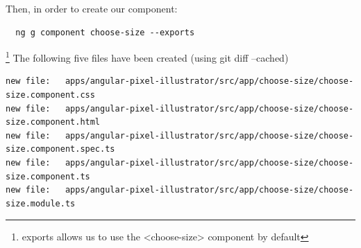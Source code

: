 Then, in order to create our component:
\begin{verbatim}
  ng g component choose-size --exports
\end{verbatim}
\footnote{exports allows us to use the <choose-size> component by default}
The following five files have been created (using git diff --cached)
\begin{lstlisting}[breaklines]
new file:   apps/angular-pixel-illustrator/src/app/choose-size/choose-size.component.css
new file:   apps/angular-pixel-illustrator/src/app/choose-size/choose-size.component.html
new file:   apps/angular-pixel-illustrator/src/app/choose-size/choose-size.component.spec.ts
new file:   apps/angular-pixel-illustrator/src/app/choose-size/choose-size.component.ts
new file:   apps/angular-pixel-illustrator/src/app/choose-size/choose-size.module.ts
\end{lstlisting}
